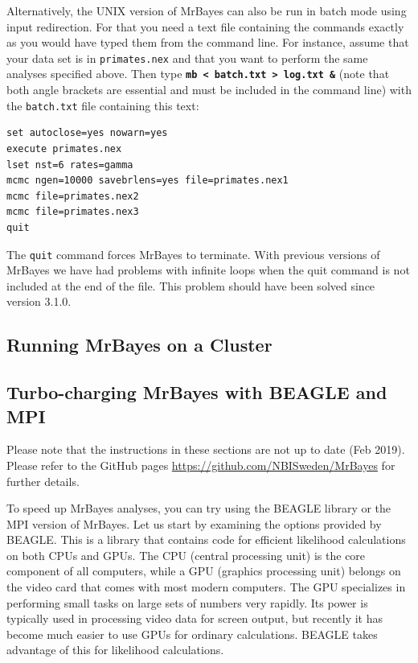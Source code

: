 \documentclass[12pt]{book}
\newcommand{\ttt}[1]{\texttt{#1} }
\newcommand{\tb}[1]{\ttt{\textbf{#1}} }
\begin{document}
Alternatively, the UNIX version of MrBayes can also be run in batch mode using input redirection.
For that you need a text file containing the commands exactly as you would have typed them from the
command line. For instance, assume that your data set is in \ttt{primates.nex} and that you want to
perform the same analyses specified above. Then type \tb{mb < batch.txt > log.txt \&} (note that
both angle brackets are essential and must be included in the command line) with the
\ttt{batch.txt} file containing this text:

\begin{singlespacing}
\small
\begin{verbatim}
set autoclose=yes nowarn=yes
execute primates.nex
lset nst=6 rates=gamma
mcmc ngen=10000 savebrlens=yes file=primates.nex1
mcmc file=primates.nex2
mcmc file=primates.nex3
quit
\end{verbatim}
\normalsize
\end{singlespacing}

The \ttt{quit} command forces MrBayes to terminate. With previous versions of MrBayes we have had
problems with infinite loops when the quit command is not included at the end of the file. This
problem should have been solved since version 3.1.0.

\subsection{Running MrBayes on a Cluster}


\subsection{Turbo-charging MrBayes with BEAGLE and MPI}
\vspace{5 pt}
{\large Please note that the instructions in these sections are not up to date
(Feb 2019). Please refer to the GitHub pages \url{https://github.com/NBISweden/MrBayes}
for further details.}
\vspace{5 pt}

To speed up MrBayes analyses, you can try using the BEAGLE library or the MPI version of MrBayes.
Let us start by examining the options provided by BEAGLE. This is a library that contains code for
efficient likelihood calculations on both CPUs and GPUs. The CPU (central processing unit) is the
core component of all computers, while a GPU (graphics processing unit) belongs on the video card
that comes with most modern computers. The GPU specializes in performing small tasks on large sets
of numbers very rapidly.  Its power is typically used in processing video data for screen output,
but recently it has become much easier to use GPUs for ordinary calculations. BEAGLE takes
advantage of this for likelihood calculations.
\end{document}
